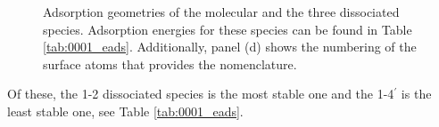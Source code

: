 \documentclass[11pt,DIV=13,BCOR=5mm,a4paper,headinclude]{scrbook}
\begin{document}
\begin{figure} [!ht]
\centering
{}
         \quad
{}
 \quad
{}
 \quad
{}
\caption{Adsorption geometries of the molecular and the three dissociated species.
Adsorption energies for these species can be found in Table \ref{tab:0001_eads}.
Additionally, panel (d) shows the numbering of the surface atoms that provides the nomenclature.}
       \label{abb:0001_ads}
\end{figure}
Of these, the 1-2 dissociated species is the most stable one and the 1-4$^\prime$ is the least stable one, see Table \ref{tab:0001_eads}.
\end{document}
